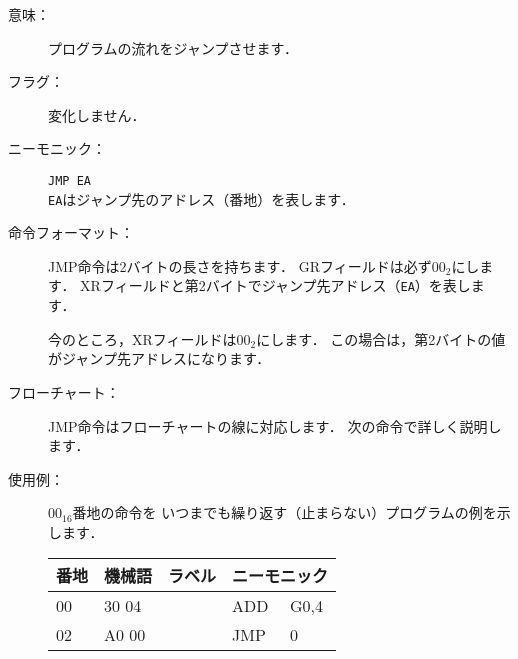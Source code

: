 \begin{description}
\item[意味：]プログラムの流れをジャンプさせます．
\item[フラグ：]変化しません．
\item[ニーモニック：]{\tt JMP EA} \\
{\tt EA}はジャンプ先のアドレス（番地）を表します．

\item[命令フォーマット：]JMP命令は2バイトの長さを持ちます．
GRフィールドは必ず$00_2$にします．
XRフィールドと第2バイトでジャンプ先アドレス（{\tt EA}）を表します．

今のところ，XRフィールドは$00_2$にします．
この場合は，第2バイトの値がジャンプ先アドレスになります．


\item[フローチャート：]JMP命令はフローチャートの線に対応します．
次の命令で詳しく説明します．

\item[使用例：]
$00_{16}$番地の命令を
いつまでも繰り返す（止まらない）プログラムの例を示します．

{\tt\small\begin{center}
\begin{tabular}{|l|l|l|l l|} \hline
番地 & 機械語 & ラベル & \multicolumn{2}{|c|}{ニーモニック} \\
\hline
00 & 30 04 & & ADD  & G0,4 \\
02 & A0 00 & & JMP  & 0    \\
\hline
\end{tabular}
\end{center}}
\end{description}

